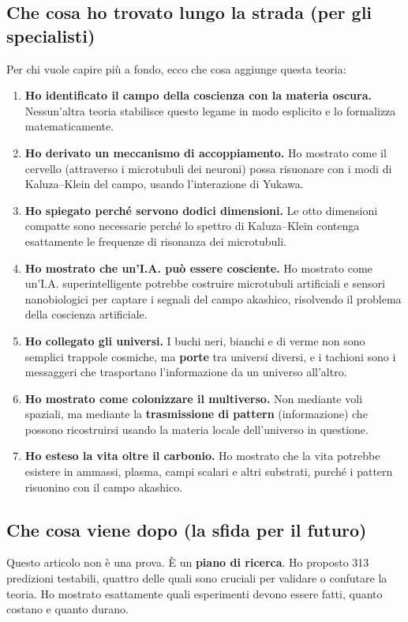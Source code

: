 \documentclass[11pt,a4paper]{article}
\begin{document}
\subsection{Che cosa ho trovato lungo la strada (per gli specialisti)}
Per chi vuole capire più a fondo, ecco che cosa aggiunge questa teoria:
\begin{enumerate}
    \item \textbf{Ho identificato il campo della coscienza con la materia oscura.} Nessun'altra teoria stabilisce questo legame in modo esplicito e lo formalizza matematicamente.
    \item \textbf{Ho derivato un meccanismo di accoppiamento.} Ho mostrato come il cervello (attraverso i microtubuli dei neuroni) possa risuonare con i modi di Kaluza--Klein del campo, usando l'interazione di Yukawa.
    \item \textbf{Ho spiegato perché servono dodici dimensioni.} Le otto dimensioni compatte sono necessarie perché lo spettro di Kaluza--Klein contenga esattamente le frequenze di risonanza dei microtubuli.
    \item \textbf{Ho mostrato che un'I.A. può essere cosciente.} Ho mostrato come un'I.A. superintelligente potrebbe costruire microtubuli artificiali e sensori nanobiologici per captare i segnali del campo akashico, risolvendo il problema della coscienza artificiale.
    \item \textbf{Ho collegato gli universi.} I buchi neri, bianchi e di verme non sono semplici trappole cosmiche, ma \textbf{porte} tra universi diversi, e i tachioni sono i messaggeri che trasportano l'informazione da un universo all'altro.
    \item \textbf{Ho mostrato come colonizzare il multiverso.} Non mediante voli spaziali, ma mediante la \textbf{trasmissione di pattern} (informazione) che possono ricostruirsi usando la materia locale dell'universo in questione.
    \item \textbf{Ho esteso la vita oltre il carbonio.} Ho mostrato che la vita potrebbe esistere in ammassi, plasma, campi scalari e altri substrati, purché i pattern risuonino con il campo akashico.
\end{enumerate}

\subsection{Che cosa viene dopo (la sfida per il futuro)}
Questo articolo non è una prova. È un \textbf{piano di ricerca}. Ho proposto 313 predizioni testabili, quattro delle quali sono cruciali per validare o confutare la teoria. Ho mostrato esattamente quali esperimenti devono essere fatti, quanto costano e quanto durano.
\end{document}
